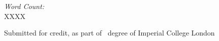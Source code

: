 \begin{titlepage}
\vspace*{2em}
\begin{center}
	\emph{Word Count:}\\
	XXXX
\end{center}

\vfill %
Submitted for credit, as part of 
\degreetype~degree of Imperial College London\\[0.5cm]

\makeatletter
\@date 
\makeatother


\end{titlepage}
